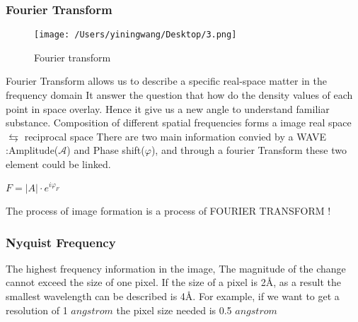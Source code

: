 \documentclass{article}
\begin{document}
    \subsubsection{Fourier Transform}
    \begin{figure}[ht]
        \centering   
        \texttt{[image: /Users/yiningwang/Desktop/3.png]} 
        \caption{\small Fourier transform}
    \end{figure}
    Fourier Transform allows us to describe a specific real-space matter in the frequency domain 
    It answer the question that how do the density values of each point in space overlay. Hence it give
     us a new angle to understand familiar substance.
    Composition of different spatial frequencies forms a image
    real space $\leftrightarrows $ reciprocal space
    There are two main information convied by a WAVE :Amplitude($\mathcal{A} $) and Phase shift($\varphi$), and through a fourier Transform
    these two element could be linked.\\
    \begin{center}
        \begin{framed}
            $F = \left\lvert A\right\rvert \cdot e^{i\varphi_F} $  
        \end{framed}
    \end{center}
    The process of image formation is a process of FOURIER TRANSFORM !
    \subsubsection{Nyquist Frequency}
    The highest frequency information in the image, The magnitude of the change cannot exceed the size of one pixel.
    If the size of a pixel is 2Å, as a result the smallest wavelength can be described is 4Å. For example, if we want to get a resolution of 1 $angstrom$
     the pixel size needed is 0.5 $angstrom$
     
\end{document}
